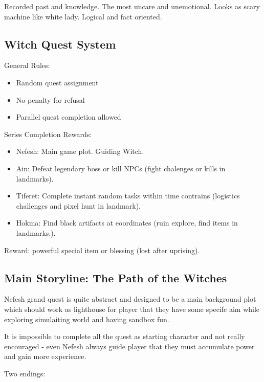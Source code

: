 \documentclass[a4paper,12pt]{article}
\begin{document}
Recorded past and knowledge. The most uncare and unemotional. Looks as scary machine like white lady. Logical and fact oriented.



\subsection{Witch Quest System}

General Rules:

\begin{itemize}
\item Random quest assignment
\item No penalty for refusal
\item Parallel quest completion allowed
\end{itemize}

Series Completion Rewards:

\begin{itemize}
\item Nefesh: Main game plot. Guiding Witch.
\item Ain: Defeat legendary boss or kill NPCs (fight chalenges or kills in landmarks).
\item Tiferet: Complete instant random tasks within time contrains (logistics challenges and pixel hunt in landmark).
\item Hokma: Find black artifacts at eoordinates (ruin explore, find items in landmarks.).
\end{itemize}

Reward: powerful special item or blessing (lost after uprising).



\subsection{Main Storyline: The Path of the Witches}

Nefesh grand quest is quite abstract and designed to be a main background plot which should work as lighthouse for player that they have some specifc aim while exploring simulaiting world and having sandbox fun.

It is impossible to complete all the quest as starting character and not really encouraged - even Nefesh always guide player that they must accumulate power and gain more experience.

Two endings:
\end{document}
